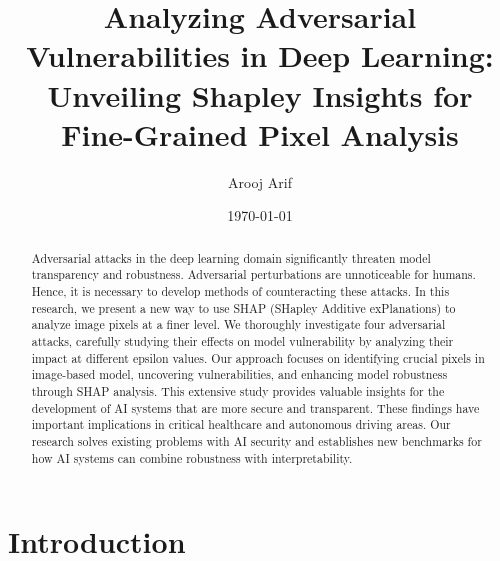 \documentclass[10pt, conference, a4paper, final]{IEEEtran}
\title{Analyzing Adversarial Vulnerabilities in Deep Learning: Unveiling Shapley Insights for Fine-Grained Pixel Analysis}
\author{Arooj Arif}
\date{\today} %
\begin{document}
\maketitle %


\begin{abstract}    
    Adversarial attacks in the deep learning domain significantly threaten model transparency and robustness. Adversarial perturbations are unnoticeable for humans. Hence, it is necessary to develop methods of counteracting these attacks. In this research, we present a new way to use SHAP (SHapley Additive exPlanations) to analyze image pixels at a finer level. We thoroughly investigate four adversarial attacks, carefully studying their effects on model vulnerability by analyzing their impact at different epsilon values. Our approach focuses on identifying crucial pixels in image-based model, uncovering vulnerabilities, and enhancing model robustness through SHAP analysis. This extensive study provides valuable insights for the development of AI systems that are more secure and transparent. These findings have important implications in critical healthcare and autonomous driving areas. Our research solves existing problems with AI security and establishes new benchmarks for how AI systems can combine robustness with interpretability.
\end{abstract}

\section{Introduction}
\end{document}
